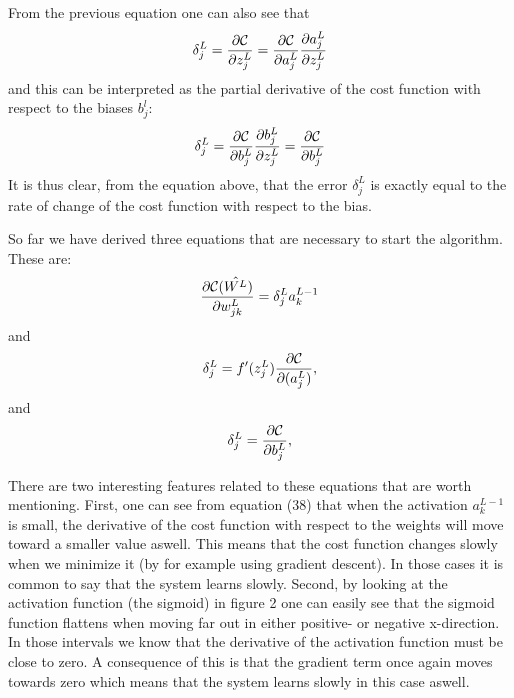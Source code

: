 \documentclass[a4paper,12pt]{article}
\begin{document}
From the previous equation one can also see that
\begin{equation}
    \delta_j^L =\frac{\partial {\cal C}}{\partial z_j^L}= \frac{\partial {\cal C}}{\partial a_j^L}\frac{\partial a_j^L}{\partial z_j^L}
\end{equation}
and this can be interpreted as the partial derivative of the cost function with respect to the biases $b_j^l$:
\begin{equation}
    \delta_j^L = \frac{\partial {\cal C}}{\partial b_j^L}\frac{\partial b_j^L}{\partial z_j^L}=\frac{\partial {\cal C}}{\partial b_j^L}
\end{equation}
It is thus clear, from the equation above, that the error $\delta_j^L$ is exactly equal to the rate of change of the cost function with respect to the bias.\newline

So far we have derived three equations that are necessary to start the algorithm. These are:
\begin{equation}
    \frac{\partial{\cal C}(\hat{W^L})}{\partial w_{jk}^L}  =  \delta_j^La_k^{L-1}
\end{equation}
and
\begin{equation}
\delta_j^L = f'(z_j^L)\frac{\partial {\cal C}}{\partial (a_j^L)},
\end{equation}
and
\begin{equation}
\delta_j^L = \frac{\partial {\cal C}}{\partial b_j^L},
\end{equation}

There are two interesting features related to these equations that are worth mentioning. First, one can see from equation (38) that when the activation $a_k^{L-1}$ is small, the derivative of the cost function with respect to the weights will move toward a smaller value aswell. This means that the cost function changes slowly when we minimize it (by for example using gradient descent). In those cases it is common to say that the system learns slowly.\newline
Second, by looking at the activation function (the sigmoid) in figure 2 one can easily see that the sigmoid function flattens when moving far out in either positive- or negative x-direction. In those intervals we know that the derivative of the activation function must be close to zero. A consequence of this is that the gradient term once again moves towards zero which means that the system learns slowly in this case aswell.\newline
\end{document}
